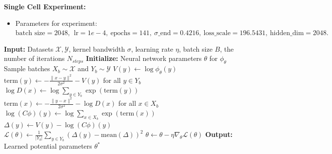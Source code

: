 \documentclass[11pt]{article}
\theoremstyle{remark}
\numberwithin{equation}{section}
\begin{document}
\noindent \textbf{Single Cell Experiment:} 
\begin{itemize}
\item Parameters for experiment: $ \text{batch size} = 2048, ~ ~ \text{lr} = 1e-4, ~ \text{epochs} = 141, ~ \sigma\text{\_end} = 0.4216, ~ \text{loss\_scale} = 196.5431, ~ \text{hidden\_dim} = 2048. $
\end{itemize}

\begin{algorithm} 
\caption{Training of ERM-Bridge}
\begin{algorithmic}[1]
\STATE  \textbf{Input:} Datasets $\mathcal{X}, \mathcal{Y}$, kernel bandwidth $\sigma$, learning rate $\eta$, batch size $B$, the number of iterations $ N_{steps}$
\STATE  \textbf{Initialize:} Neural network parameters $\theta$ for $\phi_\theta$
\STATE 
{}
    \STATE Sample batches $X_b \sim \mathcal{X}$ and $Y_b \sim \mathcal{Y}$
    \STATE
        \STATE $V(y) \leftarrow \log \phi_\theta(y)$
    \ENDFOR
    \STATE
        \STATE $\text{term}(y) \leftarrow -\frac{\|x-y\|^2}{2\sigma^2} - V(y)$ \quad for all $y \in Y_b$
        \STATE $\log D(x) \leftarrow \log \sum_{y \in Y_b} \exp(\text{term}(y))$
    \ENDFOR
    \STATE
        \STATE $\text{term}(x) \leftarrow -\frac{\|y-x\|^2}{2\sigma^2} - \log D(x)$ \quad for all $x \in X_b$
        \STATE $\log (C\phi)(y) \leftarrow \log \sum_{x \in X_b} \exp(\text{term}(x))$
    \ENDFOR
    \STATE
    \STATE $\Delta(y) \leftarrow V(y) - \log (C\phi)(y)$
    \STATE $\mathcal{L}(\theta) \leftarrow \frac{1}{|Y_b|} \sum_{y \in Y_b} \left( \Delta(y) - \text{mean}(\Delta) \right)^2$
    \STATE
    \STATE $\theta \leftarrow \theta - \eta \nabla_\theta \mathcal{L}(\theta)$
\ENDFOR
\STATE \textbf{Output:} Learned potential parameters $\theta^*$
\end{algorithmic} \label{code:algo_train}
\end{algorithm}
\end{document}
